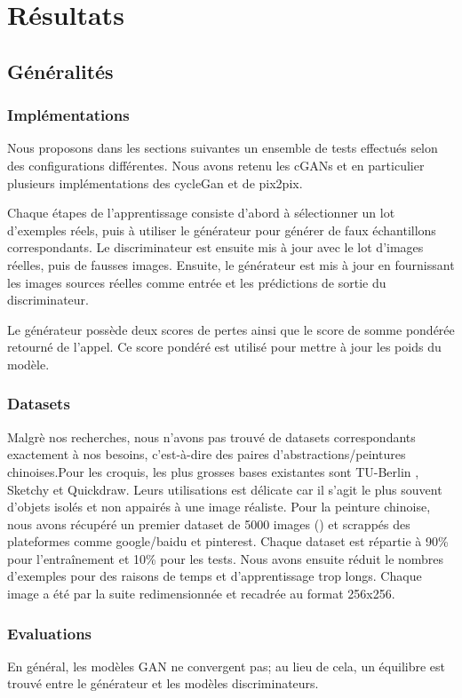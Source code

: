 \documentclass[a4paper, 12pt]{report}
\begin{document}
\chapter{Résultats}


\section{Généralités}

\subsection{Implémentations}
Nous proposons dans les sections suivantes un ensemble de tests effectués selon des configurations différentes. Nous avons retenu les cGANs et en particulier plusieurs implémentations des cycleGan et de pix2pix.

Chaque étapes de l'apprentissage consiste d’abord à sélectionner un lot d’exemples réels, puis à utiliser le générateur pour générer de faux échantillons correspondants. Le discriminateur est ensuite mis à jour avec le lot d’images réelles, puis de fausses images. Ensuite, le générateur est mis à jour en fournissant les images sources réelles comme entrée et les prédictions de sortie du discriminateur.

Le générateur possède deux scores de pertes ainsi que le score de somme pondérée retourné de l’appel. Ce score pondéré est utilisé pour mettre à jour les poids du modèle.


\subsection{Datasets}
Malgrè nos recherches, nous n'avons pas trouvé de datasets correspondants exactement à nos besoins, c'est-à-dire des paires d'abstractions/peintures chinoises.Pour les croquis, les plus grosses bases existantes sont TU-Berlin \cite{eitz2012hdhso}, Sketchy \cite{sketchy2016} et Quickdraw. Leurs utilisations est délicate car il s'agit le plus souvent d'objets isolés et non appairés à une image réaliste. Pour la peinture chinoise, nous avons récupéré un premier dataset de 5000 images (\cite{ychen93}) et scrappés des plateformes comme google/baidu et pinterest. Chaque dataset est répartie à 90\% pour l'entraînement et 10\% pour les tests. Nous avons ensuite réduit le nombres d'exemples pour des raisons de temps et d'apprentissage trop longs. Chaque image a été par la suite redimensionnée et recadrée au format 256x256.


\subsection{Evaluations}
En général, les modèles GAN ne convergent pas; au lieu de cela, un équilibre est trouvé entre le générateur et les modèles discriminateurs.
\end{document}
